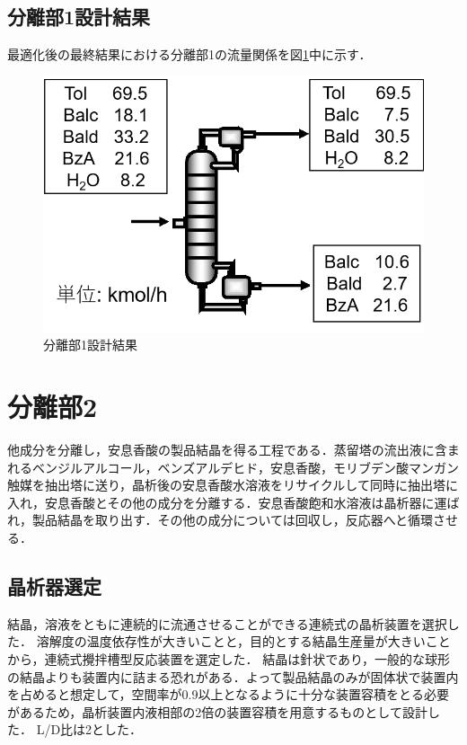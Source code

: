 \documentclass[a4j]{jsreport}
\begin{document}
\section{分離部1設計結果}
最適化後の最終結果における分離部1の流量関係を図\ref{分離部1設計結果の図}中に示す．
\begin{figure}[htbp]
  \centering
  \includegraphics[scale=0.7]{Separation1Conclusion.png}
  \caption{分離部1設計結果}
  \label{分離部1設計結果の図}
\end{figure}


\clearpage
\chapter{分離部2}
他成分を分離し，安息香酸の製品結晶を得る工程である．蒸留塔の流出液に含まれるベンジルアルコール，ベンズアルデヒド，安息香酸，モリブデン酸マンガン触媒を抽出塔に送り，晶析後の安息香酸水溶液をリサイクルして同時に抽出塔に入れ，安息香酸とその他の成分を分離する．安息香酸飽和水溶液は晶析器に運ばれ，製品結晶を取り出す．その他の成分については回収し，反応器へと循環させる．

\section{晶析器選定}
結晶，溶液をともに連続的に流通させることができる連続式の晶析装置を選択した．
溶解度の温度依存性が大きいことと，目的とする結晶生産量が大きいことから，連続式攪拌槽型反応装置を選定した．
結晶は針状であり，一般的な球形の結晶よりも装置内に詰まる恐れがある\cite{化工便覧}．よって製品結晶のみが固体状で装置内を占めると想定して，空間率が0.9以上となるように十分な装置容積をとる必要があるため，晶析装置内液相部の2倍の装置容積を用意するものとして設計した．
L/D比は2とした．
\end{document}
